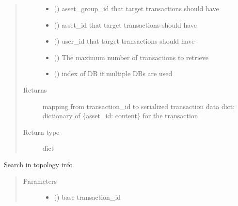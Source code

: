 \documentclass[letterpaper,10pt,english]{sphinxmanual}
\begin{document}
\begin{fulllineitems}
\begin{fulllineitems}
\begin{quote}
\begin{description}
\begin{itemize}
\item {} 
 () \textendash{} asset\_group\_id that target transactions should have

\item {} 
 () \textendash{} asset\_id that target transactions should have

\item {} 
 () \textendash{} user\_id that target transactions should have

\item {} 
 () \textendash{} The maximum number of transactions to retrieve

\item {} 
 () \textendash{} index of DB if multiple DBs are used

\end{itemize}

\item[{Returns}] \leavevmode
mapping from transaction\_id to serialized transaction data
dict: dictionary of \{asset\_id: content\} for the transaction

\item[{Return type}] \leavevmode
dict

\end{description}\end{quote}

\end{fulllineitems}


\begin{fulllineitems}
\label{\detokenize{bbc1.core.data_handler:bbc1.core.data_handler.DataHandlerDomain0.search_transaction_topology}}
Search in topology info
\begin{quote}\begin{description}
\item[{Parameters}] \leavevmode\begin{itemize}
\item {} 
 () \textendash{} base transaction\_id


\end{itemize}
\end{description}
\end{quote}
\end{fulllineitems}
\end{fulllineitems}
\end{document}
